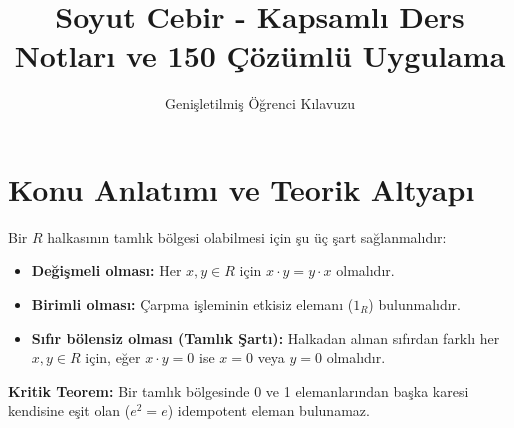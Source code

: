\documentclass[11pt, a4paper]{article}
\begin{document}
\title{\textbf{Soyut Cebir - Kapsamlı Ders Notları ve 150 Çözümlü Uygulama}}
\author{Genişletilmiş Öğrenci Kılavuzu}
\date{}
\maketitle

\tableofcontents
\newpage

\section{Konu Anlatımı ve Teorik Altyapı}

\begin{konubox}[title=\faBook\enspace 1. Tamlık Bölgesi (Integral Domain)]
Bir $R$ halkasının tamlık bölgesi olabilmesi için şu üç şart sağlanmalıdır:
\begin{itemize}
    \item \textbf{Değişmeli olması:} Her $x, y \in R$ için $x \cdot y = y \cdot x$ olmalıdır.
    \item \textbf{Birimli olması:} Çarpma işleminin etkisiz elemanı ($1_R$) bulunmalıdır.
    \item \textbf{Sıfır bölensiz olması (Tamlık Şartı):} Halkadan alınan sıfırdan farklı her $x, y \in R$ için, eğer $x \cdot y = 0$ ise $x = 0$ veya $y = 0$ olmalıdır.
\end{itemize}
\textbf{Kritik Teorem:} Bir tamlık bölgesinde 0 ve 1 elemanlarından başka karesi kendisine eşit olan ($e^2=e$) idempotent eleman bulunamaz.
\end{konubox}
\end{document}
